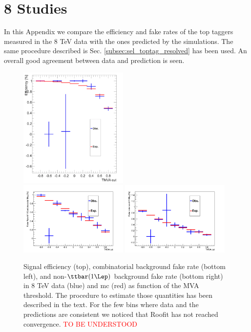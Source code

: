 \section{8\:\TeV\: Studies}
\label{app:toptaggerefficiency8TeV}

In this Appendix we compare the efficiency and fake rates of the top taggers measured in the 8 TeV data with the ones predicted by the simulations. The same procedure described is Sec. \ref{subsec:sel_toptag_resolved} has been used. An overall good agreement between data and prediction is seen.

 \begin{figure}[htbp]
	\centering
	\includegraphics[width=0.48\textwidth]{figures/TOPRESOLVEDTAGGER/c_eff.png}\\
	\includegraphics[width=0.48\textwidth]{figures/TOPRESOLVEDTAGGER/c_fr1.png}
	\includegraphics[width=0.48\textwidth]{figures/TOPRESOLVEDTAGGER/c_fr2.png}
	\caption{Signal efficiency (top),  combinatorial background fake rate (bottom left), and non-$\ttbar(1\Lep)$ background fake rate (bottom right) in 8 TeV data (blue) and mc (red) as function of the MVA threshold. The procedure to estimate those quantities has been described in the text. For the few bins where data and the predictions are consistent we noticed that Roofit has not reached convergence. \textcolor{red}{TO BE UNDERSTOOD}}
	\label{fig:roofitresults13TeV}
\end{figure}